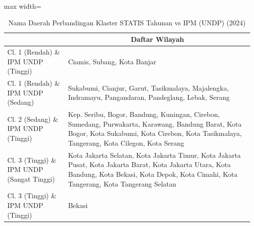 \begin{table}[H]
\centering
\caption{Nama Daerah Perbandingan Klaster STATIS Tahunan vs IPM (UNDP) (2024)} \label{tab:app2statis_ipm_name_2024}
\begin{adjustbox}{max width=\textwidth}
\begin{tabular}{|>{\centering\arraybackslash}p{4cm}|p{10cm}|}
\hline
\multicolumn{1}{|c|}{\textbf{Kategori}} & \multicolumn{1}{c|}{\textbf{Daftar Wilayah}} \\
\hline
Cl. 1 (Rendah) \& IPM UNDP (Tinggi) & Ciamis, Subang, Kota Banjar \\
\hline
Cl. 1 (Rendah) \& IPM UNDP (Sedang) & Sukabumi, Cianjur, Garut, Tasikmalaya, Majalengka, Indramayu, Pangandaran, Pandeglang, Lebak, Serang \\
\hline
Cl. 2 (Sedang) \& IPM UNDP (Tinggi) & Kep. Seribu, Bogor, Bandung, Kuningan, Cirebon, Sumedang, Purwakarta, Karawang, Bandung Barat, Kota Bogor, Kota Sukabumi, Kota Cirebon, Kota Tasikmalaya, Tangerang, Kota Cilegon, Kota Serang \\
\hline
Cl. 3 (Tinggi) \& IPM UNDP (Sangat Tinggi) & Kota Jakarta Selatan, Kota Jakarta Timur, Kota Jakarta Pusat, Kota Jakarta Barat, Kota Jakarta Utara, Kota Bandung, Kota Bekasi, Kota Depok, Kota Cimahi, Kota Tangerang, Kota Tangerang Selatan \\
\hline
Cl. 3 (Tinggi) \& IPM UNDP (Tinggi) & Bekasi \\
\hline
\end{tabular}
\end{adjustbox}
\end{table}